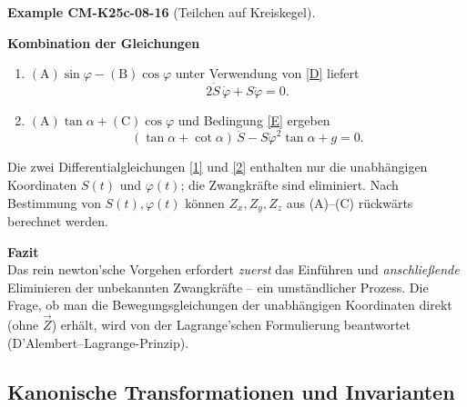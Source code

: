 \documentclass[10pt, letterpaper]{article}
\newcommand{\CustomHeading}[3]{%
  \par\medskip\noindent%
  \textbf{#1 #2} \textnormal{(#3)}.\enskip%
}
\newenvironment{EXA}[2]{\CustomHeading{Example}{#1}{#2}}{}
\begin{document}
\begin{EXA}{CM-K25c-08-16}{Teilchen auf Kreiskegel}
\textbf{Kombination der Gleichungen}\\
\begin{enumerate}
  \item[(i)]  $(\text{A})\sin\varphi - (\text{B})\cos\varphi$
              unter Verwendung von \eqref{D} liefert
              \[
                2\dot S\,\dot\varphi + S\ddot\varphi = 0. \tag{1}
              \]
  \item[(ii)] $(\text{A})\tan\alpha + (\text{C})\cos\varphi$
              und Bedingung \eqref{E} ergeben
              \[
                (\tan\alpha + \cot\alpha)\,\ddot S
                - S\dot\varphi^{2}\tan\alpha + g = 0. \tag{2}
              \]
\end{enumerate}
Die zwei Differential­gleichungen \eqref{1} und \eqref{2} enthalten nur
die unabhängigen Koordinaten $S(t)$ und $\varphi(t)$;
die Zwangkräfte sind eliminiert.  
Nach Bestimmung von $S(t),\varphi(t)$ können $Z_x,Z_y,Z_z$ aus
(A)–(C) rückwärts berechnet werden.

\textbf{Fazit}\\
Das rein newton’sche Vorgehen erfordert
\emph{zuerst} das Einführen und
\emph{anschließende} Eliminieren der unbekannten Zwangkräfte – ein
umständlicher Prozess.  
Die Frage, ob man die Bewegungsgleichungen der unabhängigen Koordinaten
direkt (ohne $\vec Z$) erhält, wird von der Lagrange’schen Formulierung
beantwortet (D’Alembert–Lagrange-Prinzip).
\end{EXA}

\subsection{Kanonische Transformationen und Invarianten}
\end{document}

